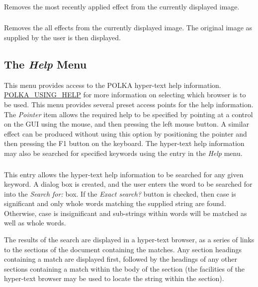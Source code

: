 \subsubsection { } 
Removes the most recently applied effect from the currently displayed
image.

\subsubsection { } 
Removes the all effects from the currently displayed image. The original
image as supplied by the user is then displayed.

\subsection {The {\em Help} Menu}
This menu provides access to the POLKA hyper-text help information. 
\hyperref{Go here}{See section }{}{POLKA_USING_HELP} for more information
on selecting which browser is to be used. This menu provides several preset
access points for the help information. The {\em Pointer} item allows the 
required help to be specified by pointing at a control on the GUI using the 
mouse, and then pressing the left mouse button. A similar effect can be
produced without using this option by positioning the pointer and then
pressing the F1 button on the keyboard. The hyper-text help information
may also be searched for specified keywords using the 
 entry in the {\em Help} menu.

\subsubsection {}
This entry allows the hyper-text help information to be searched for any
given keyword. A dialog box is created, and the user enters the word to
be searched for into the {\em Search for:} box. If the {\em Exact
search?} button is checked, then case is significant and only whole words
matching the supplied string are found. Otherwise, case is insignificant
and sub-strings within words will be matched as well as whole words.

The results of the search are displayed in a hyper-text browser, as a
series of links to the sections of the document containing the matches.
Any section headings containing a match are displayed first, followed by
the headings of any other sections containing a match within the body of
the section (the facilities of the hyper-text browser may be used to
locate the string within the section).

